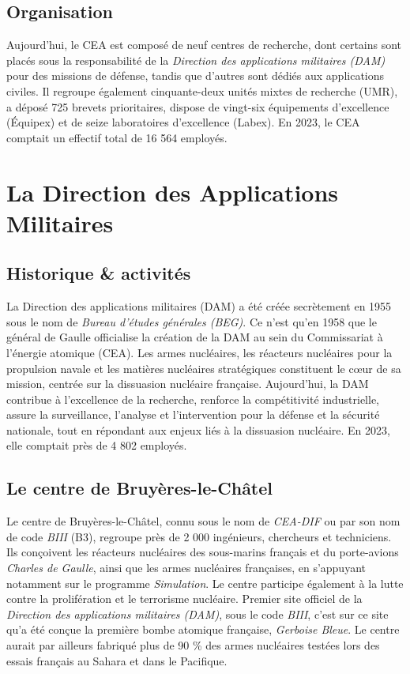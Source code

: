 \documentclass[12pt,a4paper]{report}
\begin{document}
\subsection{Organisation}
Aujourd'hui, le CEA est composé de neuf centres de recherche, dont certains sont placés sous la responsabilité de la \textit{Direction des applications militaires (DAM)} pour des missions de défense, tandis que d'autres sont dédiés aux applications civiles. Il regroupe également cinquante-deux unités mixtes de recherche (UMR), a déposé 725 brevets prioritaires, dispose de vingt-six équipements d’excellence (Équipex) et de seize laboratoires d’excellence (Labex). En 2023, le CEA comptait un effectif total de 16 564 employés.


\section{La Direction des Applications Militaires}
\subsection{Historique \& activités}
La Direction des applications militaires (DAM) a été créée secrètement en 1955 sous le nom de \textit{Bureau d'études générales (BEG)}. Ce n'est qu'en 1958 que le général de Gaulle officialise la création de la DAM au sein du Commissariat à l'énergie atomique (CEA). Les armes nucléaires, les réacteurs nucléaires pour la propulsion navale et les matières nucléaires stratégiques constituent le cœur de sa mission, centrée sur la dissuasion nucléaire française.
Aujourd'hui, la DAM contribue à l'excellence de la recherche, renforce la compétitivité industrielle, assure la surveillance, l'analyse et l'intervention pour la défense et la sécurité nationale, tout en répondant aux enjeux liés à la dissuasion nucléaire. En 2023, elle comptait près de 4 802 employés.
\subsection{Le centre de Bruyères-le-Châtel}
Le centre de Bruyères-le-Châtel, connu sous le nom de \textit{CEA-DIF} ou par son nom de code \textit{BIII} (B3), regroupe près de 2 000 ingénieurs, chercheurs et techniciens. Ils conçoivent les réacteurs nucléaires des sous-marins français et du porte-avions \textit{Charles de Gaulle}, ainsi que les armes nucléaires françaises, en s’appuyant notamment sur le programme \textit{Simulation}. Le centre participe également à la lutte contre la prolifération et le terrorisme nucléaire.
Premier site officiel de la \textit{Direction des applications militaires (DAM)}, sous le code \textit{BIII}, c’est sur ce site qu’a été conçue la première bombe atomique française, \textit{Gerboise Bleue}. Le centre aurait par ailleurs fabriqué plus de 90 \% des armes nucléaires testées lors des essais français au Sahara et dans le Pacifique.
\end{document}
